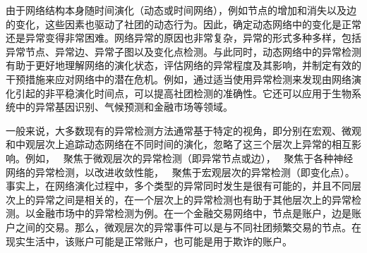
由于网络结构本身随时间演化（动态或时间网络）\cite{huang2015triadic}，例如节点的增加和消失以及边的变化，这些因素也驱动了社团的动态行为。因此，确定动态网络中的变化是正常还是异常变得非常困难。网络异常的原因也非常复杂，异常的形式多种多样，包括异常节点、异常边、异常子图以及变化点检测\cite{ranshous2015anomaly}。与此同时，动态网络中的异常检测有助于更好地理解网络的演化状态，评估网络的异常程度及其影响，并制定有效的干预措施来应对网络中的潜在危机。例如，通过适当使用异常检测来发现由网络演化引起的非平稳演化时间点，可以提高社团检测的准确性。它还可以应用于生物系统中的异常基因识别、气候预测和金融市场等领域。

一般来说，大多数现有的异常检测方法通常基于特定的视角，即分别在宏观、微观和中观层次上追踪动态网络在不同时间的演化，忽略了这三个层次上异常的相互影响。例如，~\cite{hassanzadeh2013semi,heard2010bayesian} 聚焦于微观层次的异常检测（即异常节点或边），~\cite{8648298,7953678,XIAO2019124} 聚焦于各种神经网络的异常检测，以改进收敛性能，~\cite{hulovatyy2016scout,cheung2020simultaneous} 聚焦于宏观层次的异常检测（即变化点）。事实上，在网络演化过程中，多个类型的异常同时发生是很有可能的，并且不同层次上的异常之间是相关的，在一个层次上的异常检测也有助于其他层次上的异常检测。以金融市场中的异常检测为例。在一个金融交易网络中，节点是账户，边是账户之间的交易。那么，微观层次的异常事件可以是与不同社团频繁交易的节点。在现实生活中，该账户可能是正常账户，也可能是用于欺诈的账户。

